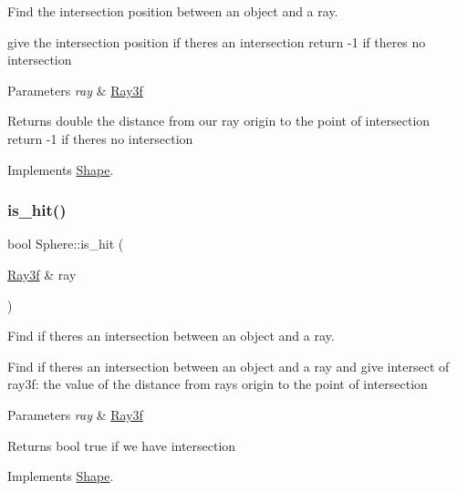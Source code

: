 Find the intersection position between an object and a ray. 

give the intersection position if there\textquotesingle{}s an intersection return -\/1 if there\textquotesingle{}s no intersection 
\begin{DoxyParams}{Parameters}
{\em ray} & \mbox{\hyperlink{class_ray3f}{Ray3f}} \\
\hline
\end{DoxyParams}
\begin{DoxyReturn}{Returns}
double the distance from our ray origin to the point of intersection return -\/1 if there\textquotesingle{}s no intersection 
\end{DoxyReturn}


Implements \mbox{\hyperlink{class_shape_aae1d31ff6fb4237397bf11afd07d7e48}{Shape}}.

\mbox{\label{class_sphere_a29e5c6f306c166c59b5d462205177f27}} 
\subsubsection{\texorpdfstring{is\+\_\+hit()}{is\_hit()}}
{\footnotesize\ttfamily bool Sphere\+::is\+\_\+hit (\begin{DoxyParamCaption}\item[{\mbox{\hyperlink{class_ray3f}{Ray3f}} \&}]{ray }\end{DoxyParamCaption})\hspace{0.3cm}{\ttfamily [virtual]}}



Find if there\textquotesingle{}s an intersection between an object and a ray. 

Find if there\textquotesingle{}s an intersection between an object and a ray and give intersect of ray3f\+: the value of the distance from ray\textquotesingle{}s origin to the point of intersection 
\begin{DoxyParams}{Parameters}
{\em ray} & \mbox{\hyperlink{class_ray3f}{Ray3f}} \\
\hline
\end{DoxyParams}
\begin{DoxyReturn}{Returns}
bool true if we have intersection 
\end{DoxyReturn}


Implements \mbox{\hyperlink{class_shape_ab443b81b74cfb1d248d23cc049da7ddd}{Shape}}.

